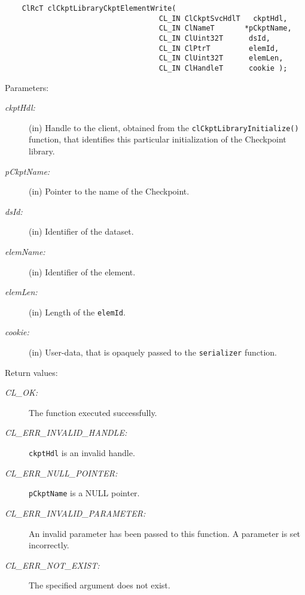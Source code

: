 \begin{flushleft}
\begin{Desc}
\footnotesize\begin{verbatim}    ClRcT clCkptLibraryCkptElementWrite(
                                	CL_IN ClCkptSvcHdlT   ckptHdl,
                                	CL_IN ClNameT       *pCkptName,
                                	CL_IN ClUint32T      dsId,
                                	CL_IN ClPtrT         elemId,
                                	CL_IN ClUint32T      elemLen,
                                	CL_IN ClHandleT      cookie );
\end{verbatim}
\normalsize
\end{Desc}
\begin{Desc}
\item[Parameters:]
\begin{description}
\item[{\em ckpt\-Hdl:}](in) Handle to the client, obtained from the {\tt{clCkptLibraryInitialize()}} function, that identifies this particular 
initialization of the Checkpoint library. 
\item[{\em p\-Ckpt\-Name:}](in) Pointer to the name of the Checkpoint. 
\item[{\em ds\-Id:}](in) Identifier of the dataset.
\item[{\em elem\-Name:}](in) Identifier of the element. 
\item[{\em elem\-Len:}](in) Length of the {\tt{elem\-Id}}. 
\item[{\em cookie:}](in) User-data, that is opaquely passed to the {\tt{serializer}} function.\end{description}
\end{Desc}
\begin{Desc}
\item[Return values:]
\begin{description}
\item[{\em CL\_\-OK:}]The function executed successfully. \item[{\em CL\_\-ERR\_\-INVALID\_\-HANDLE:}]{\tt{ckptHdl}} is an invalid handle.
\item[{\em CL\_\-ERR\_\-NULL\_\-POINTER:}]{\tt{p\-Ckpt\-Name}} is a NULL pointer. 
\item[{\em CL\_\-ERR\_\-INVALID\_\-PARAMETER:}]An invalid parameter has been passed to this function. A parameter is set incorrectly.
\item[{\em CL\_\-ERR\_\-NOT\_\-EXIST:}]The specified argument does not exist.\end{description}
\end{Desc}
\begin{Desc}

\end{Desc}
\end{flushleft}
